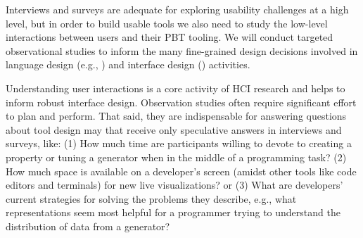 
%
Interviews and surveys are adequate for exploring usability challenges
at a high level, but in order
to build usable tools we also need to study the low-level interactions
between users and their PBT tooling.  We will
conduct targeted observational studies to inform the many
fine-grained design decisions
involved in language design (e.g., ) and
interface design () activities.

Understanding user interactions
is a core activity of HCI research and helps to inform robust interface design.
Observation studies often require significant effort to plan and
perform. That said, they
are indispensable for answering questions about tool design may that receive only
speculative answers in interviews and surveys, like:
(1) How much time
are participants willing to devote to
creating a property or tuning a generator when in the
middle of a programming task?
(2) How much space is available on a developer's
screen (amidst other tools like code editors and terminals) for
new live
visualizations? or
(3) What are developers' current strategies for solving the
problems they describe, e.g., what representations
seem most helpful
for a programmer trying to understand the distribution of data from a
generator?

